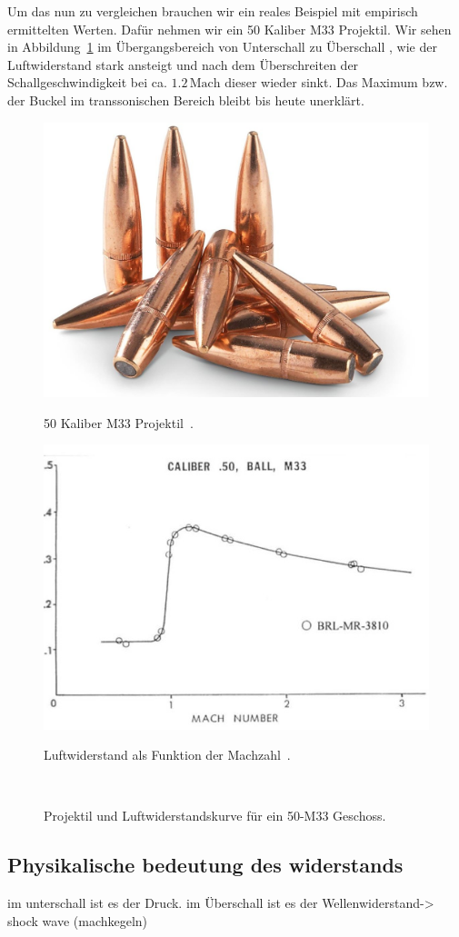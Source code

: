 Um das nun zu vergleichen brauchen wir ein reales Beispiel mit
empirisch ermittelten Werten.
Dafür nehmen wir ein 50 Kaliber M33 Projektil.
Wir sehen in Abbildung~\ref{fig:luftwiderstand_50-M33}
im Übergangsbereich von Unterschall zu Überschall
, wie der Luftwiderstand stark ansteigt
und nach dem Überschreiten der Schallgeschwindigkeit bei ca. $1.2\,\mathrm{Mach}$
dieser wieder sinkt.
Das Maximum bzw. der Buckel im transsonischen Bereich bleibt bis heute unerklärt.
\begin{figure}
    \centering
    \begin{minipage}[t]{0.4\textwidth}
        \centering
        \includegraphics[width=\linewidth]{papers/ueberschall/figures/50-cal_projectile.jpg}
        \caption*{50 Kaliber M33 Projektil~\cite{ArmoryFarm50BMG}.}
    \end{minipage}
    \hfill
    \begin{minipage}[t]{0.55\textwidth}
        \centering
        \includegraphics[width=\linewidth]{papers/ueberschall/figures/50-M33 Geschoss.jpg}
        \caption*{Luftwiderstand als Funktion der Machzahl~\cite{Mittelkaliber2020}.}
    \end{minipage}
    \caption{Projektil und Luftwiderstandskurve für ein 50-M33 Geschoss.}
    ~\label{fig:luftwiderstand_50-M33}
\end{figure}

\subsection{Physikalische bedeutung des widerstands}
im unterschall ist es der Druck.
im Überschall ist es der Wellenwiderstand-> shock wave (machkegeln)